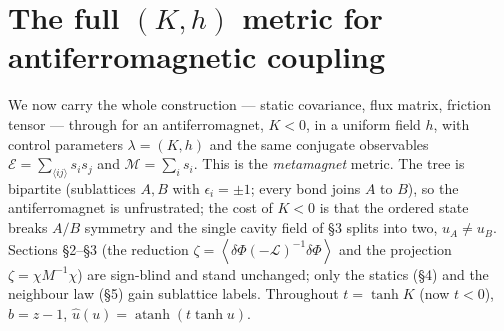 \documentclass[11pt]{article}
\newcommand{\atanh}{\operatorname{atanh}}
\newcommand{\eq}{\mathcal{E}}
\newcommand{\mg}{\mathcal{M}}
\newcommand{\LL}{\mathcal{L}}
\newcommand{\avg}[1]{\left\langle #1 \right\rangle}
\newcommand{\dPhi}{\delta\Phi}
\begin{document}
\section{The full \texorpdfstring{$(K,h)$}{(K,h)} metric for antiferromagnetic coupling}
\label{sec:af}

We now carry the whole construction --- static covariance, flux matrix, friction tensor --- through
for an antiferromagnet, $K<0$, in a uniform field $h$, with control parameters $\lambda=(K,h)$ and the
same conjugate observables $\eq=\sum_{\langle ij\rangle}s_is_j$ and $\mg=\sum_i s_i$. This is the
\emph{metamagnet} metric. The tree is bipartite (sublattices $A,B$ with $\epsilon_i=\pm1$; every bond
joins $A$ to $B$), so the antiferromagnet is unfrustrated; the cost of $K<0$ is that the ordered state
breaks $A/B$ symmetry and the single cavity field of \S3 splits into two, $u_A\neq u_B$. Sections
\S2--\S3 (the reduction $\zeta=\avg{\dPhi(-\LL)^{-1}\dPhi}$ and the projection $\zeta=\chi M^{-1}\chi$)
are sign-blind and stand unchanged; only the statics (\S4) and the neighbour law (\S5) gain sublattice
labels. Throughout $t=\tanh K$ (now $t<0$), $b=z-1$, $\hat u(u)=\atanh(t\tanh u)$.
\end{document}
